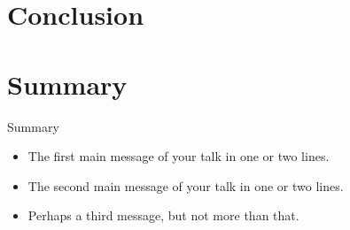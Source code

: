 \documentclass{beamer}
\begin{document}
\section{Conclusion}

\section*{Summary}

\begin{frame}{Summary}
    \begin{itemize}
    \item The \alert{first main message} of your talk in one or two lines.
    \item The \alert{second main message} of your talk in one or two lines.
    \item Perhaps a \alert{third message}, but not more than that.
    \end{itemize}
\end{frame}
\end{document}
